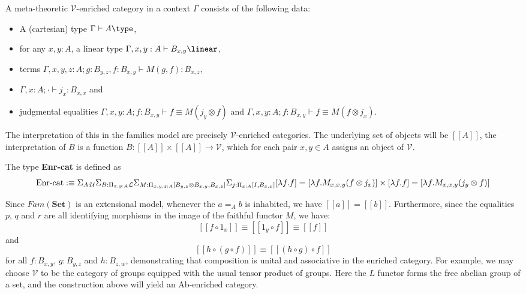 \begin{defn}
  A meta-theoretic $\mathcal{V}$-enriched category in a context $\Gamma$ consists of the following data:
 \begin{itemize}
\item A (cartesian) type $\Gamma \vdash A \type$,
\item for any $x, y : A$, a linear type $\Gamma, x, y : A \vdash B_{x, y} \linear$,
\item terms $\Gamma, x, y, z : A; g: B_{y, z}, f:  B_{x, y} \vdash M(g, f) : B_{x, z}$,
\item $\Gamma, x : A; \cdot \vdash j_x : B_{x, x}$ and
\item judgmental equalities $\Gamma, x, y : A; f : B_{x, y} \vdash f \equiv M(j_y \otimes f)$ and $\Gamma, x, y : A; f : B_{x, y} \vdash f \equiv M(f \otimes j_x)$.
\end{itemize}
\end{defn}
The interpretation of this in the families model are precisely $\mathcal{V}$-enriched categories. The underlying set of objects will be $[[A]]$, the interpretation of $B$ is a function $B : [[A]] \times [[A]] \to \mathcal{V}$, which for each pair $x, y \in A$ assigns an object of $\mathcal{V}$. 
\begin{defn}
  The type \textbf{Enr-cat} is defined as
  \[
\text{Enr-cat} :\equiv \Sigma_{A : \mathcal{U}} \Sigma_{B : \Pi_{x, y : A}\mathcal{L}} \Sigma_{M : \Pi_{x, y, z : A} [B_{y, z} \otimes B_{x, y}, B_{x,z}]} \Sigma_{j : \Pi_{x: A}[I, B_{x, x}]}[\lambda f. f] = [\lambda f. M_{x, x, y}(f \otimes j_x)] \times [\lambda f. f] = [\lambda f. M_{x, x, y}(j_y \otimes f)] \\
  \]
\end{defn}
Since $Fam(\mathbf{Set})$ is an extensional model, whenever the $a =_A b$ is inhabited, we have $[[a]]=[[b]]$. Furthermore, since the equalities $p$, $q$ and $r$ are all identifying morphisms in the image of the faithful functor $M$, we have:
\[
[[f \circ 1_x ]] \equiv [[1_y \circ f]] \equiv [[f]]
\]
and
\[
[[h \circ (g \circ f)]] \equiv [[(h \circ g) \circ f]]
\]
for all $f : B_{x,y}$, $g : B_{y,z}$ and $h : B_{z,w}$, demonstrating that composition is unital and associative in the enriched category.
For example, we may choose $\mathcal{V}$ to be the category of groups equipped with the usual tensor product of groups. Here the $L$ functor forms the free abelian group of a set, and the construction above will yield an Ab-enriched category.
